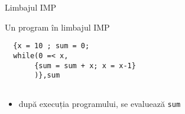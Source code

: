 \documentclass[xcolor=x11names,compress,10pt]{beamer}
\begin{document}
\begin{frame}[fragile]{Limbajul IMP}

\begin{example}
Un program în limbajul IMP

\begin{verbatim}
  {x = 10 ; sum = 0;
  while(0 =< x,
       {sum = sum + x; x = x-1}
       )},sum
       
\end{verbatim}


\end{example}

\begin{itemize}
\item {}

după execuția programului, se evaluează  \texttt{sum} 
\end{itemize}

\end{frame}

\end{document}
